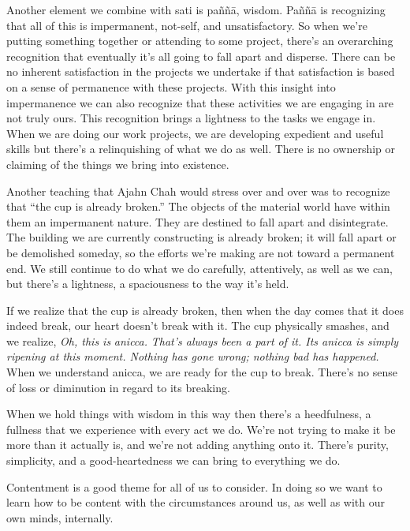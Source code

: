 Another element we combine with sati is paññā, wisdom. Paññā is 
recognizing that all of this is impermanent, not-self, and 
unsatisfactory. So when we're putting something together or attending 
to some project, there's an overarching recognition that eventually 
it's all going to fall apart and disperse. There can be no inherent 
satisfaction in the projects we undertake if that satisfaction is based 
on a sense of permanence with these projects. With this insight into 
impermanence we can also recognize that these activities we are 
engaging in are not truly ours. This recognition brings a lightness to 
the tasks we engage in. When we are doing our work projects, we are 
developing expedient and useful skills but there's a relinquishing of 
what we do as well. There is no ownership or claiming of the things we 
bring into existence.

Another teaching that Ajahn Chah would stress over and over was to 
recognize that ``the cup is already broken.'' The objects of the 
material world have within them an impermanent nature. They are 
destined to fall apart and disintegrate. The building we are currently 
constructing is already broken; it will fall apart or be demolished 
someday, so the efforts we're making are not toward a permanent end. We 
still continue to do what we do carefully, attentively, as well as we 
can, but there's a lightness, a spaciousness to the way it's held.

If we realize that the cup is already broken, then when the day comes 
that it does indeed break, our heart doesn't break with it. The cup 
physically smashes, and we realize, \emph{Oh, this is} \emph{anicca.} 
\emph{That's always been a part of it. Its anicca is simply ripening at 
this moment. Nothing has gone wrong; nothing bad has happened.} When we 
understand anicca, we are ready for the cup to break. There's no sense 
of loss or diminution in regard to its breaking.

When we hold things with wisdom in this way then there's a heedfulness, 
a fullness that we experience with every act we do. We're not trying to 
make it be more than it actually is, and we're not adding anything onto 
it. There's purity, simplicity, and a good-heartedness we can bring to 
everything we do.


Contentment is a good theme for all of us to consider. In doing so we 
want to learn how to be content with the circumstances around us, as 
well as with our own minds, internally.

